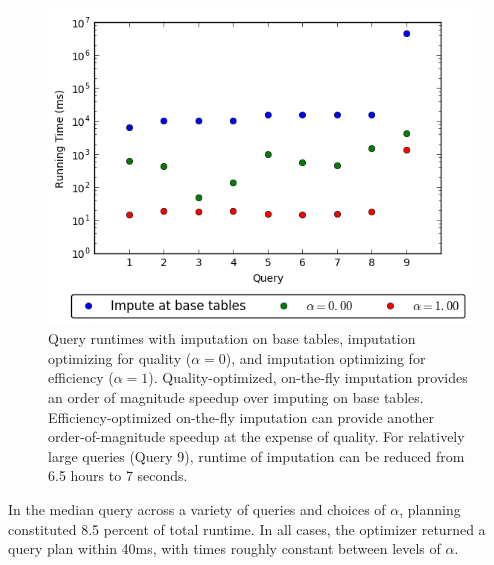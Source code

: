 \begin{figure}
\includegraphics[width=\columnwidth]{figures/running_times_combined.png}
\caption{Query runtimes with imputation on base tables, \ProjectName{} imputation
    optimizing for quality ($\alpha=0$), and \ProjectName{} imputation optimizing for
    efficiency ($\alpha=1$). Quality-optimized, on-the-fly imputation provides an order of
    magnitude speedup over imputing on base tables. Efficiency-optimized on-the-fly
    imputation can provide another order-of-magnitude speedup at the expense of quality. For
    relatively large queries (Query 9), runtime of imputation can be reduced from 6.5
    hours to 7 seconds. }
\label{fig:runtimes}
\end{figure}


In the median query across a variety of queries and choices of $\alpha$, planning
constituted 8.5 percent of total runtime. In all cases, the optimizer
returned a query plan within 40ms, with times roughly constant between levels of $\alpha$.



